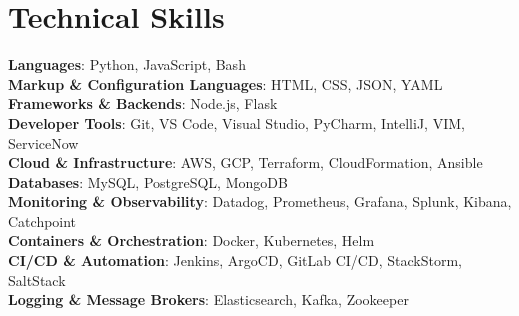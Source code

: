 \documentclass[letterpaper,11pt]{article}
\begin{document}
%
\section{Technical Skills}
 \begin{itemize}[leftmargin=0.15in, label={}]
    \small{\item{
      \textbf{Languages}{: Python, JavaScript, Bash} \\
      \textbf{Markup \& Configuration Languages}{: HTML, CSS, JSON, YAML} \\
      \textbf{Frameworks \& Backends}{: Node.js, Flask} \\
     \textbf{Developer Tools}{: Git, VS Code, Visual Studio, PyCharm, IntelliJ, VIM, ServiceNow} \\
     \textbf{Cloud \& Infrastructure}{: AWS, GCP, Terraform, CloudFormation, Ansible} \\
     \textbf{Databases}{: MySQL, PostgreSQL, MongoDB} \\
     \textbf{Monitoring \& Observability}{: Datadog, Prometheus, Grafana, Splunk, Kibana, Catchpoint} \\
     \textbf{Containers \& Orchestration}{: Docker, Kubernetes, Helm} \\
     \textbf{CI/CD \& Automation}{: Jenkins, ArgoCD, GitLab CI/CD, StackStorm, SaltStack} \\
     \textbf{Logging \& Message Brokers}{: Elasticsearch, Kafka, Zookeeper} \\
    }}
 \end{itemize}


\end{document}
